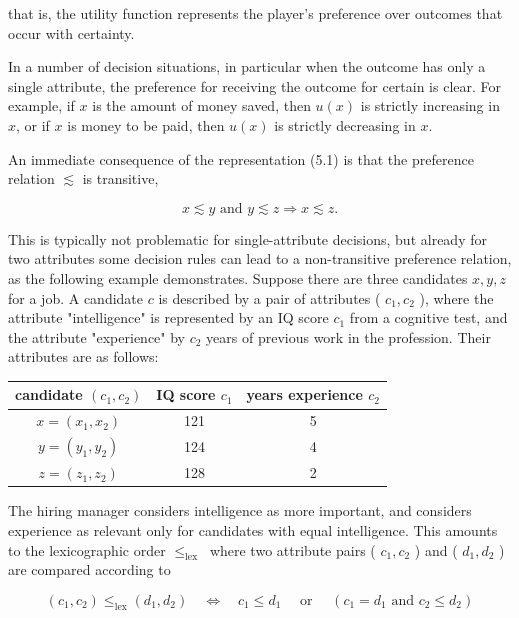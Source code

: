 \documentclass[12pt]{article}
\begin{document}
that is, the utility function represents the player's preference over outcomes that occur with certainty.

In a number of decision situations, in particular when the outcome has only a single attribute, the preference for receiving the outcome for certain is clear. For example, if $x$ is the amount of money saved, then $u(x)$ is strictly increasing in $x$, or if $x$ is money to be paid, then $u(x)$ is strictly decreasing in $x$.

An immediate consequence of the representation (5.1) is that the preference relation $\lesssim$ is transitive,


\begin{equation*}
x \lesssim y \text { and } y \lesssim z \Rightarrow x \lesssim z . \tag{5.9}
\end{equation*}


This is typically not problematic for single-attribute decisions, but already for two attributes some decision rules can lead to a non-transitive preference relation, as the following example demonstrates. Suppose there are three candidates $x, y, z$ for a job. A candidate $c$ is described by a pair of attributes ( $c_{1}, c_{2}$ ), where the attribute "intelligence" is represented by an IQ score $c_{1}$ from a cognitive test, and the attribute "experience" by $c_{2}$ years of previous work in the profession. Their attributes are as follows:

\begin{center}
\begin{tabular}{|c|c|c|}
\hline
candidate $\left(c_{1}, c_{2}\right)$ & IQ score $c_{1}$ & years experience $c_{2}$ \\
\hline
$x=\left(x_{1}, x_{2}\right)$ & 121 & 5 \\
$y=\left(y_{1}, y_{2}\right)$ & 124 & 4 \\
$z=\left(z_{1}, z_{2}\right)$ & 128 & 2 \\
\hline
\end{tabular}
\end{center}

The hiring manager considers intelligence as more important, and considers experience as relevant only for candidates with equal intelligence. This amounts\\
to the lexicographic order $\leq_{\text {lex }}$ where two attribute pairs ( $c_{1}, c_{2}$ ) and ( $d_{1}, d_{2}$ ) are compared according to


\begin{equation*}
\left(c_{1}, c_{2}\right) \leq_{\operatorname{lex}}\left(d_{1}, d_{2}\right) \quad \Leftrightarrow \quad c_{1} \leq d_{1} \quad \text { or } \quad\left(c_{1}=d_{1} \text { and } c_{2} \leq d_{2}\right) \tag{5.11}
\end{equation*}
\end{document}
